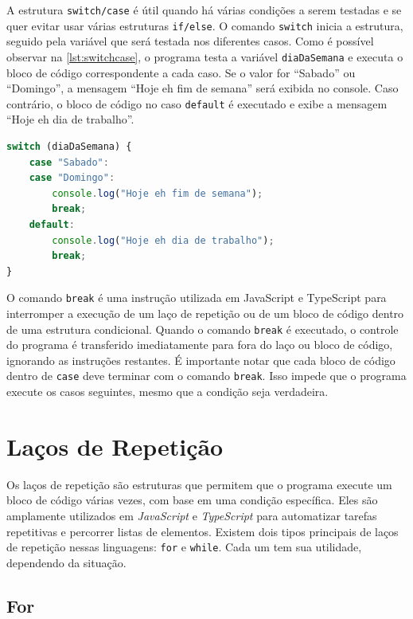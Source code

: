 A estrutura \texttt{switch/case} é útil quando há várias condições a serem testadas e se quer evitar usar várias estruturas \texttt{if/else}. O comando \texttt{switch} inicia a estrutura, seguido pela variável que será testada nos diferentes casos. Como é possível observar na \autoref{lst:switchcase}, o programa testa a variável \texttt{diaDaSemana} e executa o bloco de código correspondente a cada caso. Se o valor for ``Sabado'' ou ``Domingo'', a mensagem ``Hoje eh fim de semana'' será exibida no console. Caso contrário, o bloco de código no caso \texttt{default} é executado e exibe a mensagem ``Hoje eh dia de trabalho''.

\begin{lstlisting}[language=TypeScript, caption=Exemplo de condicional \texttt{switch/case} em JS e TS., label=lst:switchcase]
switch (diaDaSemana) {
    case "Sabado":
    case "Domingo":
        console.log("Hoje eh fim de semana");
        break;
    default:
        console.log("Hoje eh dia de trabalho");
        break;
}
\end{lstlisting}

O comando \texttt{break} é uma instrução utilizada em JavaScript e TypeScript para interromper a execução de um laço de repetição ou de um bloco de código dentro de uma estrutura condicional. Quando o comando \texttt{break} é executado, o controle do programa é transferido imediatamente para fora do laço ou bloco de código, ignorando as instruções restantes. É importante notar que cada bloco de código dentro de \texttt{case} deve terminar com o comando \texttt{break}. Isso impede que o programa execute os casos seguintes, mesmo que a condição seja verdadeira.


\section{Laços de Repetição}
\label{JS_lacosRepeticao}

Os laços de repetição são estruturas que permitem que o programa execute um bloco de código várias vezes, com base em uma condição específica. Eles são amplamente utilizados em \textit{JavaScript} e \textit{TypeScript} para automatizar tarefas repetitivas e percorrer listas de elementos. Existem dois tipos principais de laços de repetição nessas linguagens: \texttt{for} e \texttt{while}. Cada um tem sua utilidade, dependendo da situação.

\subsection{For}


